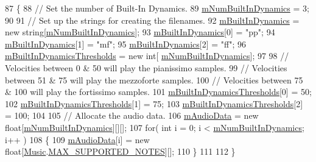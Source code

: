 \begin{DoxyCode}
87     \{
88         \textcolor{comment}{// Set the number of Built-In Dynamics.}
89         \hyperlink{group___v_i_base_pro_var_gac265f64f759d267ee1e1680f8d387011}{mNumBuiltInDynamics} = 3;
90 
91         \textcolor{comment}{// Set up the strings for creating the filenames.}
92         \hyperlink{group___v_i_base_pro_var_ga87961e72f25fbc2256b614a394aa6f13}{mBuiltInDynamics} = \textcolor{keyword}{new} \textcolor{keywordtype}{string}[\hyperlink{group___v_i_base_pro_var_gac265f64f759d267ee1e1680f8d387011}{mNumBuiltInDynamics}];
93         \hyperlink{group___v_i_base_pro_var_ga87961e72f25fbc2256b614a394aa6f13}{mBuiltInDynamics}[0] = \textcolor{stringliteral}{"pp"};
94         \hyperlink{group___v_i_base_pro_var_ga87961e72f25fbc2256b614a394aa6f13}{mBuiltInDynamics}[1] = \textcolor{stringliteral}{"mf"};
95         \hyperlink{group___v_i_base_pro_var_ga87961e72f25fbc2256b614a394aa6f13}{mBuiltInDynamics}[2] = \textcolor{stringliteral}{"ff"};
96         \hyperlink{group___v_i_base_pro_var_gae3db4264dc2a96e99ea680c6d637e6bf}{mBuiltInDynamicsThresholds} = \textcolor{keyword}{new} \textcolor{keywordtype}{int}[
      \hyperlink{group___v_i_base_pro_var_gac265f64f759d267ee1e1680f8d387011}{mNumBuiltInDynamics}];
97 
98         \textcolor{comment}{// Velocities between 0 & 50 will play the pianissimo samples.}
99         \textcolor{comment}{// Velocities between 51 & 75 will play the mezzoforte samples.}
100         \textcolor{comment}{// Velocities between 75 & 100 will play the fortissimo samples.  }
101         \hyperlink{group___v_i_base_pro_var_gae3db4264dc2a96e99ea680c6d637e6bf}{mBuiltInDynamicsThresholds}[0] = 50;
102         \hyperlink{group___v_i_base_pro_var_gae3db4264dc2a96e99ea680c6d637e6bf}{mBuiltInDynamicsThresholds}[1] = 75;
103         \hyperlink{group___v_i_base_pro_var_gae3db4264dc2a96e99ea680c6d637e6bf}{mBuiltInDynamicsThresholds}[2] = 100;
104 
105         \textcolor{comment}{// Allocate the audio data.}
106         \hyperlink{group___v_i_base_pro_var_ga52e76d9b74408660584676035a92a2c6}{mAudioData} = \textcolor{keyword}{new} \textcolor{keywordtype}{float}[\hyperlink{group___v_i_base_pro_var_gac265f64f759d267ee1e1680f8d387011}{mNumBuiltInDynamics}][][];
107         \textcolor{keywordflow}{for}( \textcolor{keywordtype}{int} i = 0; i < \hyperlink{group___v_i_base_pro_var_gac265f64f759d267ee1e1680f8d387011}{mNumBuiltInDynamics}; i++ )
108         \{
109             \hyperlink{group___v_i_base_pro_var_ga52e76d9b74408660584676035a92a2c6}{mAudioData}[i] = \textcolor{keyword}{new} \textcolor{keywordtype}{float}[\hyperlink{class_music}{Music}.\hyperlink{group___music_constants_gaaf07da909a12e9fec0e43b70864f27b7}{MAX\_SUPPORTED\_NOTES}][];
110         \}
111 
112     \}
\end{DoxyCode}
